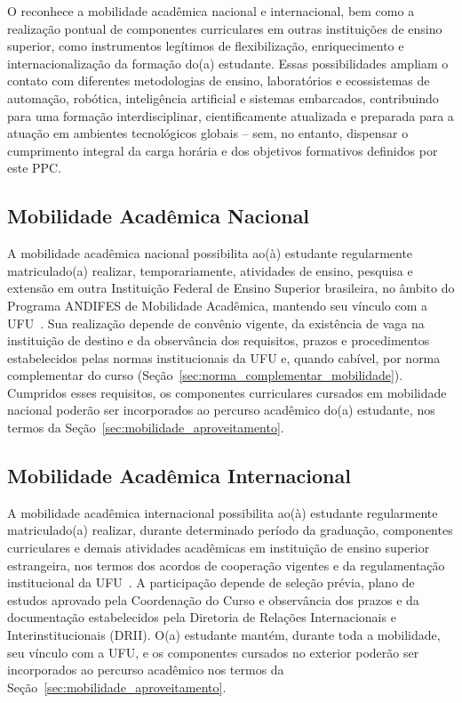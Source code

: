 O \ppccurso reconhece a mobilidade acadêmica nacional e internacional, bem como a realização pontual de componentes curriculares em outras instituições de ensino superior, como instrumentos legítimos de flexibilização, enriquecimento e internacionalização da formação do(a) estudante. Essas possibilidades ampliam o contato com diferentes metodologias de ensino, laboratórios e ecossistemas de automação, robótica, inteligência artificial e sistemas embarcados, contribuindo para uma formação interdisciplinar, cientificamente atualizada e preparada para a atuação em ambientes tecnológicos globais -- sem, no entanto, dispensar o cumprimento integral da carga horária e dos objetivos formativos definidos por este PPC.

\subsection{Mobilidade Acadêmica Nacional}

A mobilidade acadêmica nacional possibilita ao(à) estudante regularmente matriculado(a) realizar, temporariamente, atividades de ensino, pesquisa e extensão em outra Instituição Federal de Ensino Superior brasileira, no âmbito do Programa ANDIFES de Mobilidade Acadêmica, mantendo seu vínculo com a UFU~\cite{ufu_congrad_08_2004,ufu_congrad_13_2013}. Sua realização depende de convênio vigente, da existência de vaga na instituição de destino e da observância dos requisitos, prazos e procedimentos estabelecidos pelas normas institucionais da UFU e, quando cabível, por norma complementar do curso (Seção~\ref{sec:norma_complementar_mobilidade}). Cumpridos esses requisitos, os componentes curriculares cursados em mobilidade nacional poderão ser incorporados ao percurso acadêmico do(a) estudante, nos termos da Seção~\ref{sec:mobilidade_aproveitamento}.

\subsection{Mobilidade Acadêmica Internacional}

A mobilidade acadêmica internacional possibilita ao(à) estudante regularmente matriculado(a) realizar, durante determinado período da graduação, componentes curriculares e demais atividades acadêmicas em instituição de ensino superior estrangeira, nos termos dos acordos de cooperação vigentes e da regulamentação institucional da UFU~\cite{ufu_congrad_112_2023}. A participação depende de seleção prévia, plano de estudos aprovado pela Coordenação do Curso e observância dos prazos e da documentação estabelecidos pela Diretoria de Relações Internacionais e Interinstitucionais (DRII). O(a) estudante mantém, durante toda a mobilidade, seu vínculo com a UFU, e os componentes cursados no exterior poderão ser incorporados ao percurso acadêmico nos termos da Seção~\ref{sec:mobilidade_aproveitamento}.

